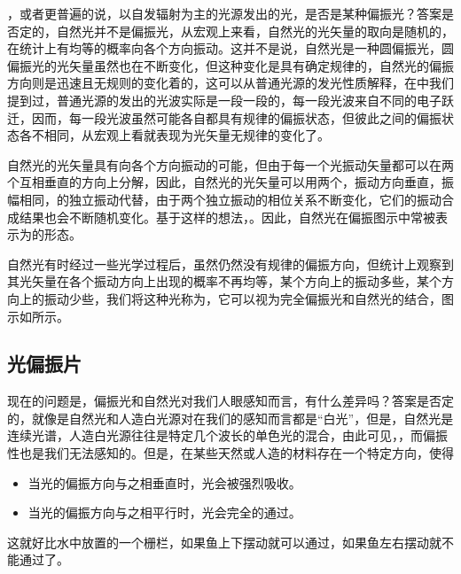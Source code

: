 ，或者更普遍的说，以自发辐射为主的光源发出的光，是否是某种偏振光？答案是否定的，自然光并不是偏振光，从宏观上来看，自然光的光矢量的取向是随机的，在统计上有均等的概率向各个方向振动。这并不是说，自然光是一种圆偏振光，圆偏振光的光矢量虽然也在不断变化，但这种变化是具有确定规律的，自然光的偏振方向则是迅速且无规则的变化着的，这可以从普通光源的发光性质解释，在中我们提到过，普通光源的发出的光波实际是一段一段的，每一段光波来自不同的电子跃迁，因而，每一段光波虽然可能各自都具有规律的偏振状态，但彼此之间的偏振状态各不相同，从宏观上看就表现为光矢量无规律的变化了。

自然光的光矢量具有向各个方向振动的可能，但由于每一个光振动矢量都可以在两个互相垂直的方向上分解，因此，自然光的光矢量可以用两个，振动方向垂直，振幅相同，的独立振动代替，由于两个独立振动的相位关系不断变化，它们的振动合成结果也会不断随机变化。基于这样的想法，。因此，自然光在偏振图示中常被表示为的形态。
\begin{OldFigure}[自然光]
\end{OldFigure}

自然光有时经过一些光学过程后，虽然仍然没有规律的偏振方向，但统计上观察到其光矢量在各个振动方向上出现的概率不再均等，某个方向上的振动多些，某个方向上的振动少些，我们将这种光称为，它可以视为完全偏振光和自然光的结合，图示如所示。
\begin{OldFigure}[部分偏振光]
    \begin{OldFigureSub}[水平部分偏振]
    \end{OldFigureSub}\vspace{0.5cm}
    \begin{OldFigureSub}[垂直部分偏振]
    \end{OldFigureSub}
\end{OldFigure}

\subsection{光偏振片}
\label{subsec:光偏振片}
现在的问题是，偏振光和自然光对我们人眼感知而言，有什么差异吗？答案是否定的，就像是自然光和人造白光源对在我们的感知而言都是“白光”，但是，自然光是连续光谱，人造白光源往往是特定几个波长的单色光的混合，由此可见，，而偏振性也是我们无法感知的。但是，在某些天然或人造的材料存在一个特定方向，使得
\begin{itemize}
    \item 当光的偏振方向与之相垂直时，光会被强烈吸收。
    \item 当光的偏振方向与之相平行时，光会完全的通过。
\end{itemize}
这就好比水中放置的一个栅栏，如果鱼上下摆动就可以通过，如果鱼左右摆动就不能通过了。

